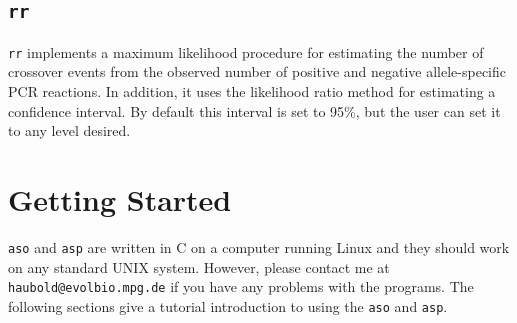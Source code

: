 \documentclass{article}
\newcommand{\ty}{\texttt}
\begin{document}
\subsection{\ty{rr}}
\ty{rr} implements a maximum likelihood procedure for estimating the
number of crossover events from the observed number of positive and
negative allele-specific PCR reactions. In addition, it uses the
likelihood ratio method for estimating a confidence interval. By
default this interval is set to 95\%, but the user can set it to any
level desired.

\section{Getting Started}
\ty{aso} and \ty{asp} are written in C on a computer running Linux and
they should
work on any standard UNIX system. However, please contact me at
\ty{haubold@evolbio.mpg.de} if you have any problems with the
programs. The following sections give a tutorial introduction to using
the \ty{aso} and \ty{asp}.
\end{document}
